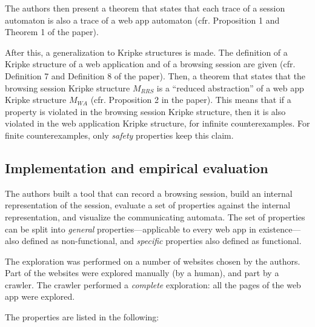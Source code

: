 \documentclass[a4paper,10pt]{article}
\theoremstyle{plain} %
\theoremstyle{definition}
\theoremstyle{remark}
\begin{document}
The authors then present a theorem that states that each trace of a session automaton is also a trace of a web app automaton (cfr. Proposition 1 and Theorem 1 of the paper).

After this, a generalization to Kripke structures is made. The definition of a Kripke structure of a web application and of a browsing session are given (cfr. Definition 7 and Definition 8 of the paper). Then, a theorem that states that the browsing session Kripke structure $M_{RRS}$ is a ``reduced abstraction'' of a web app Kripke structure $M_{WA}$ (cfr. Proposition 2 in the paper). This means that if a property is violated in the browsing session Kripke structure, then it is also violated in the web application Kripke structure, for infinite counterexamples. For finite counterexamples, only \textit{safety} properties keep this claim.

\subsection{Implementation and empirical evaluation}

The authors built a tool that can record a browsing session, build an internal representation of the session, evaluate a set of properties against the internal representation, and visualize the communicating automata. The set of properties can be split into \textit{general} properties---applicable to every web app in existence---also defined as non-functional, and \textit{specific} properties also defined as functional.

The exploration was performed on a number of websites chosen by the authors. Part of the websites were explored manually (by a human), and part by a crawler. The crawler performed a \emph{complete} exploration: all the pages of the web app were explored.

The properties are listed in the following:
\end{document}
